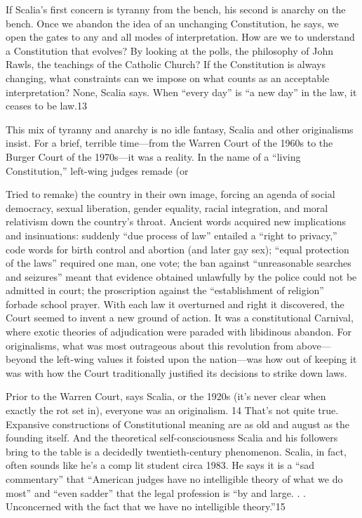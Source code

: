  \par 
If Scalia’s first concern is tyranny from the bench, his second is anarchy on the bench. Once we abandon the idea of an unchanging Constitution, he says, we open the gates to any and all modes of interpretation. How are we to understand a Constitution that evolves? By looking at the polls, the philosophy of John Rawls, the teachings of the Catholic Church? If the Constitution is always changing, what constraints can we impose on what counts as an acceptable interpretation? None, Scalia says. When “every day” is “a new day” in the law, it ceases to be law.{\color{blue}13}
 \par 
This mix of tyranny and anarchy is no idle fantasy, Scalia and other originalisms insist. For a brief, terrible time—from the Warren Court of the 1960s to the Burger Court of the 1970s—it was a reality. In the name of a “living Constitution,” left-wing judges remade (or
 \par 
Tried to remake) the country in their own image, forcing an agenda of social democracy, sexual liberation, gender equality, racial integration, and moral relativism down the country’s throat. Ancient words acquired new implications and insinuations: suddenly “due process of law” entailed a “right to privacy,” code words for birth control and abortion (and later gay sex); “equal protection of the laws” required one man, one vote; the ban against “unreasonable searches and seizures” meant that evidence obtained unlawfully by the police could not be admitted in court; the proscription against the “establishment of religion” forbade school prayer. With each law it overturned and right it discovered, the Court seemed to invent a new ground of action. It was a constitutional Carnival, where exotic theories of adjudication were paraded with libidinous abandon. For originalisms, what was most outrageous about this revolution from above—beyond the left-wing values it foisted upon the nation—was how out of keeping it was with how the Court traditionally justified its decisions to strike down laws.
 \par 
Prior to the Warren Court, says Scalia, or the 1920s (it’s never clear when exactly the rot set in), everyone was an originalism. {\color{blue}14} That’s not quite true. Expansive constructions of Constitutional meaning are as old and august as the founding itself. And the theoretical self-consciousness Scalia and his followers bring to the table is a decidedly twentieth-century phenomenon. Scalia, in fact, often sounds like he’s a comp lit student circa 1983. He says it is a “sad commentary” that “American judges have no intelligible theory of what we do most” and “even sadder” that the legal profession is “by and large. . . Unconcerned with the fact that we have no intelligible theory.”{\color{blue}15}
